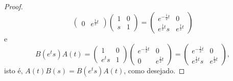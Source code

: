 \begin{proof}
\begin{equation*}
\begin{pmatrix}
            0 & e^{\frac12 t}
        \end{pmatrix}
        \begin{pmatrix}
            1 & 0\\
            s & 1
        \end{pmatrix} =
        \begin{pmatrix}
            e^{-\frac12 t} & 0\\
            e^{\frac12t}s & e^{\frac12 t}
        \end{pmatrix}
    \end{equation*}
    e
    \begin{equation*}
        B(e^ts)A(t) = \begin{pmatrix}
            1 & 0\\
            e^ts & 1
        \end{pmatrix}
        \begin{pmatrix}
            e^{-\frac12 t} & 0\\
            0 & e^{\frac12 t}
        \end{pmatrix} =
        \begin{pmatrix}
            e^{-\frac12 t} & 0\\
            e^{\frac12t}s & e^{\frac12 t}
        \end{pmatrix},
    \end{equation*}
    isto é, \(A(t) B(s) = B(e^ts)A(t)\), como desejado.
\end{proof}
